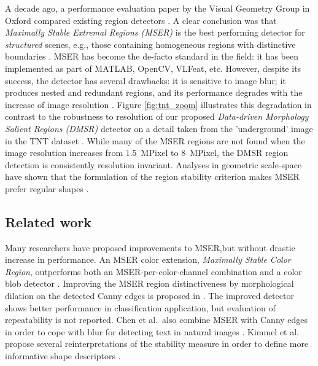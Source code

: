 \documentclass[conference,compsoc]{IEEEtran}
\begin{document}
A decade ago, a performance evaluation paper by the Visual Geometry Group in Oxford compared existing region detectors \cite{Mikolajczyk:2005}. 
A clear conclusion was that {\em  Maximally Stable Extremal Regions (MSER)} is the best performing detector for {\em structured} scenes, e.g., those containing homogeneous regions with distinctive boundaries \cite{Matas2002BMVC}. MSER has become the de-facto standard in the field: it has been implemented as part of MATLAB, OpenCV, VLFeat, etc. However, despite its success, the detector has several drawbacks: it is sensitive to image blur; it produces nested and redundant regions, and its performance degrades with the increase of image resolution \cite{CorRos2013}. Figure \ref{fig:tnt_zoom} illustrates this degradation in contrast to the robustness to resolution of our proposed {\em Data-driven Morphology Salient Regions (DMSR)} detector on a detail taken from the 'underground' image in the TNT dataset \cite{CorRos2013}. While many of the MSER regions are not found when the image resolution increases from $1.5$~MPixel to $8$~MPixel, the DMSR region detection is consistently resolution invariant. Analyses in geometric scale-space have shown that the formulation of the region stability criterion makes MSER prefer regular shapes \cite{Kimmel11}.

\subsection{Related work}
Many researchers have proposed improvements to MSER,but without drastic increase in performance. An MSER color extension, {\em Maximally Stable Color Region}, outperforms both an MSER-per-color-channel combination and a color blob detector \cite{Forssen07}. Improving the MSER region distinctiveness by morphological dilation on the detected Canny edges is proposed in \cite{Wang14}. The improved detector shows better performance in classification application, but evaluation of repeatability is not reported. 
Chen et al.~also combine MSER with Canny edges in order to cope with blur for detecting text in natural images \cite{Chen11}.
Kimmel et al. %
propose several reinterpretations of the stability measure in order to define more informative shape descriptors \cite{Kimmel11}. 
\end{document}
